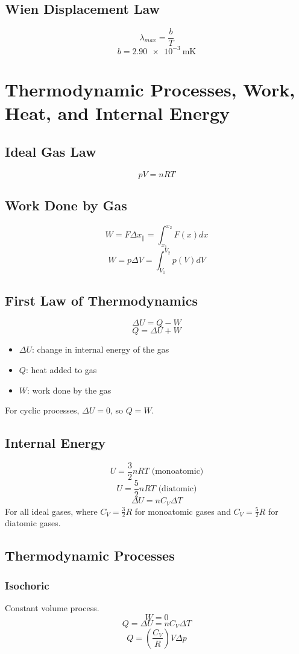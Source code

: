 \documentclass{article}
\begin{document}
\subsection{Wien Displacement Law}
\[\lambda_{max}=\frac{b}{T}\]
\[b=\SI{2.90e-3}{\meter\kelvin}\]

\section{Thermodynamic Processes, Work, Heat, and Internal Energy}

\subsection{Ideal Gas Law}
\[pV=nRT\]

\subsection{Work Done by Gas}
\[W=F\Delta x_{\parallel}=\int_{x_1}^{x_2}F(x)dx\]
\[W=p\Delta V = \int_{V_1}^{V_2}p(V)dV\]

\subsection{First Law of Thermodynamics}
\[\Delta U=Q-W\]
\[Q=\Delta U+W\]
\begin{itemize}
    \item $\Delta U$: change in internal energy of the gas
    \item $Q$: heat added to gas
    \item $W$: work done by the gas
\end{itemize}
For cyclic processes, $\Delta U=0$, so $Q=W$.

\subsection{Internal Energy}
\[U=\frac{3}{2}nRT\text{ (monoatomic)}\] 
\[U=\frac{5}{2}nRT\text{ (diatomic)}\]
\[\Delta U = nC_V \Delta T\]
For all ideal gases, where $C_V=\frac{3}{2}R$ for monoatomic gases and $C_V=\frac{5}{2}R$ for diatomic gases.

\subsection{Thermodynamic Processes}
\subsubsection{Isochoric}
Constant volume process.
\[W=0\]
\[Q=\Delta U=nC_V\Delta T\]
\[Q=\left(\frac{C_V}{R}\right)V\Delta p\]
\end{document}
